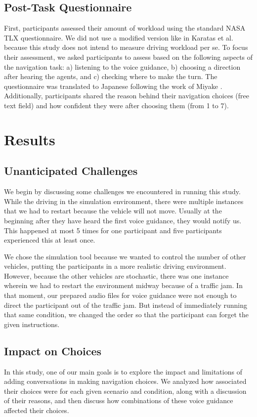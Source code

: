 \subsection{Post-Task Questionnaire}
\label{sec:post-task}
First, participants assessed their amount of workload using the standard NASA TLX questionnaire. We did not use a modified version like in Karatas et al. \cite{Karatas2018} because this study does not intend to measure driving workload per se. To focus their assessment, we asked participants to assess based on the following aspects of the navigation task: a) listening to the voice guidance, b) choosing a direction after hearing the agents, and c) checking where to make the turn. The questionnaire was translated to Japanese following the work of Miyake \cite{MIYAKE2015}. Additionally, participants shared the reason behind their navigation choices (free text field) and how confident they were after choosing them (from 1 to 7).

\section{Results}

\subsection{Unanticipated Challenges}
We begin by discussing some challenges we encountered in running this study. While the driving in the simulation environment, there were multiple instances that we had to restart because the vehicle will not move. Usually at the beginning after they have heard the first voice guidance, they would notify us. This happened at most 5 times for one participant and five participants experienced this at least once. 

We chose the simulation tool because we wanted to control the number of other vehicles, putting the participants in a more realistic driving environment. However, because the other vehicles are stochastic, there was one instance wherein we had to restart the environment midway because of a traffic jam. In that moment, our prepared audio files for voice guidance were not enough to direct the participant out of the traffic jam. But instead of immediately running that same condition, we changed the order so that the participant can forget the given instructions.

\subsection{Impact on Choices}
In this study, one of our main goals is to explore the impact and limitations of adding conversations in making navigation choices. We analyzed how associated their choices were for each given scenario and condition, along with a discussion of their reasons, and then discuss how combinations of these voice guidance affected their choices. 

